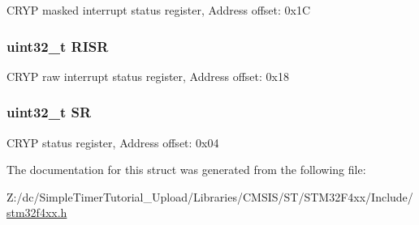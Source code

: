 C\-R\-Y\-P masked interrupt status register, Address offset\-: 0x1\-C \hypertarget{struct_c_r_y_p___type_def_aa196fddf0ba7d6e3ce29bdb04eb38b94}{
\subsubsection[{R\-I\-S\-R}]{ uint32\-\_\-t R\-I\-S\-R}}\label{struct_c_r_y_p___type_def_aa196fddf0ba7d6e3ce29bdb04eb38b94}
C\-R\-Y\-P raw interrupt status register, Address offset\-: 0x18 \hypertarget{struct_c_r_y_p___type_def_af6aca2bbd40c0fb6df7c3aebe224a360}{
\subsubsection[{S\-R}]{ uint32\-\_\-t S\-R}}\label{struct_c_r_y_p___type_def_af6aca2bbd40c0fb6df7c3aebe224a360}
C\-R\-Y\-P status register, Address offset\-: 0x04 

The documentation for this struct was generated from the following file\-:\begin{DoxyCompactItemize}
\item 
Z\-:/dc/\-Simple\-Timer\-Tutorial\-\_\-\-Upload/\-Libraries/\-C\-M\-S\-I\-S/\-S\-T/\-S\-T\-M32\-F4xx/\-Include/\hyperlink{stm32f4xx_8h}{stm32f4xx.\-h}\end{DoxyCompactItemize}
